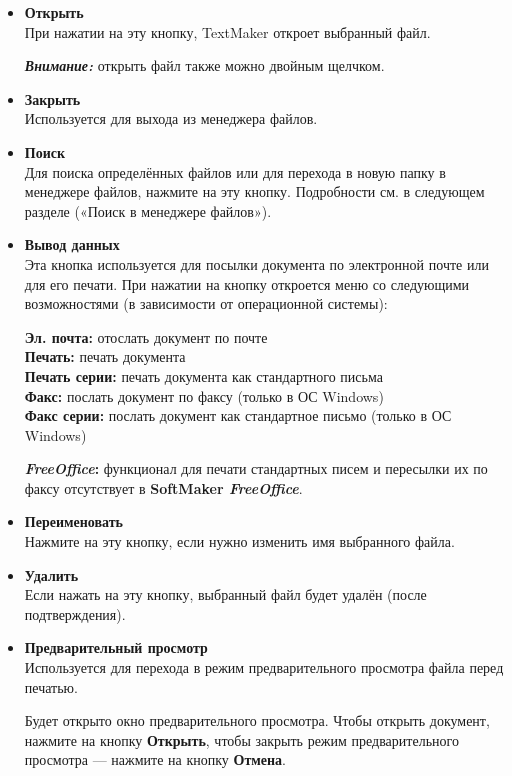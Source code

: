 ﻿\documentclass[a4paper,10pt]{article}
\begin{document}
\begin{itemize}
 \item \textbf{Открыть}\\
 При нажатии на эту кнопку, TextMaker откроет выбранный файл.
 
 \begin{mdframed}[backgroundcolor=blue!10]
\textbf{\textit{Внимание:}} открыть файл также можно двойным щелчком.
\end{mdframed}
\item \textbf{Закрыть}\\
Используется для выхода из менеджера файлов.
\item \textbf{Поиск}\\
Для поиска определённых файлов или для перехода в новую папку в менеджере файлов, нажмите на эту кнопку. Подробности см. в следующем разделе («Поиск в менеджере файлов»).
\item \textbf{Вывод данных}\\
Эта кнопка используется для посылки документа по электронной почте или для его печати. При нажатии на кнопку откроется меню со следующими возможностями (в зависимости от операционной системы):

\textbf{Эл. почта:} отослать документ по почте\\
\textbf{Печать:} печать документа\\
\textbf{Печать серии:} печать документа как стандартного письма\\
\textbf{Факс:} послать документ по факсу (только в ОС Windows)\\
\textbf{Факс серии:} послать документ как стандартное письмо (только в ОС Windows)\\
 \begin{mdframed}[backgroundcolor=pink!50]
\textbf{\textit{FreeOffice}:} функционал для печати стандартных писем и пересылки их по факсу отсутствует в \textbf{SoftMaker \textit{FreeOffice}}.
\end{mdframed}
\item \textbf{Переименовать}\\
Нажмите на эту кнопку, если нужно изменить имя выбранного файла.
\item \textbf{Удалить}\\
Если нажать на эту кнопку, выбранный файл будет удалён (после подтверждения).
\item \textbf{Предварительный просмотр}\\
Используется для перехода в режим предварительного просмотра файла перед печатью.

Будет открыто окно предварительного просмотра. Чтобы открыть документ, нажмите на кнопку \textbf{Открыть}, чтобы закрыть режим предварительного просмотра — нажмите на кнопку \textbf{Отмена}.
\end{itemize}
\end{document}
